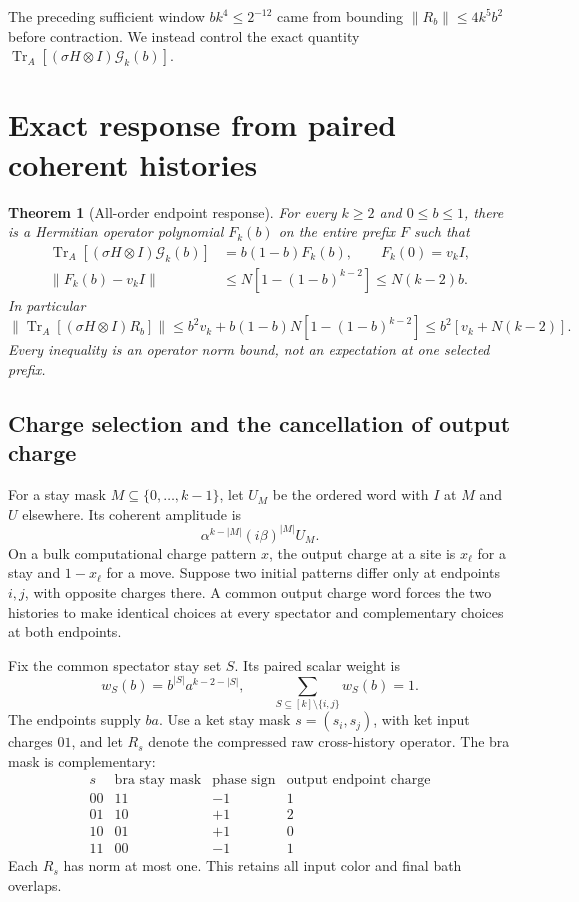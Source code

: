 \documentclass[11pt]{article}
\newtheorem{theorem}{Theorem}[section]
\newcommand{\Tr}{\operatorname{Tr}}
\newcommand{\norm}[1]{\lVert #1\rVert}
\begin{document}
The preceding sufficient window \(bk^4\le2^{-12}\) came from bounding
\(\norm{R_b}\le4k^5b^2\) before contraction. We instead control the exact
quantity \(\Tr_A[(\sigma H\otimes I)\mathcal G_k(b)]\).

\section{Exact response from paired coherent histories}

\begin{theorem}[All-order endpoint response]\label{thm:response}
For every \(k\ge2\) and \(0\le b\le1\), there is a Hermitian operator
polynomial \(F_k(b)\) on the entire prefix \(F\) such that
\begin{align}
 \Tr_A[(\sigma H\otimes I)\mathcal G_k(b)]
   &=b(1-b)F_k(b),\qquad F_k(0)=v_kI,\label{eq:Fidentity}\\
 \norm{F_k(b)-v_kI}
   &\le N[1-(1-b)^{k-2}]
    \le N(k-2)b.\label{eq:Fbound}
\end{align}
In particular
\begin{equation}\label{eq:contracted}
 \norm{\Tr_A[(\sigma H\otimes I)R_b]}
 \le b^2v_k+b(1-b)N[1-(1-b)^{k-2}]
 \le b^2[v_k+N(k-2)].
\end{equation}
Every inequality is an operator norm bound, not an expectation at one
selected prefix.
\end{theorem}

\subsection{Charge selection and the cancellation of output charge}

For a stay mask \(M\subseteq\{0,\ldots,k-1\}\), let \(U_M\) be the ordered
word with \(I\) at \(M\) and \(U\) elsewhere. Its coherent amplitude is
\[
 \alpha^{k-|M|}(i\beta)^{|M|}U_M.
\]
On a bulk computational charge pattern \(x\), the output charge at a site
is \(x_\ell\) for a stay and \(1-x_\ell\) for a move. Suppose two initial
patterns differ only at endpoints \(i,j\), with opposite charges there.
A common output charge word forces the two histories to make identical
choices at every spectator and complementary choices at both endpoints.

Fix the common spectator stay set \(S\). Its paired scalar weight is
\[
 w_S(b)=b^{|S|}a^{k-2-|S|},\qquad
 \sum_{S\subseteq[k]\setminus\{i,j\}}w_S(b)=1.
\]
The endpoints supply \(ba\). Use a ket stay mask
\(s=(s_i,s_j)\), with ket input charges \(01\), and let \(R_s\) denote
the compressed raw cross-history operator. The bra mask is complementary:
\[
\begin{array}{c|c|c|c}
s&\text{bra stay mask}&\text{phase sign}&
       \text{output endpoint charge}\\ \hline
00&11&-1&1\\
01&10&+1&2\\
10&01&+1&0\\
11&00&-1&1
\end{array}
\]
Each \(R_s\) has norm at most one. This retains all input color and final
bath overlaps.
\end{document}
